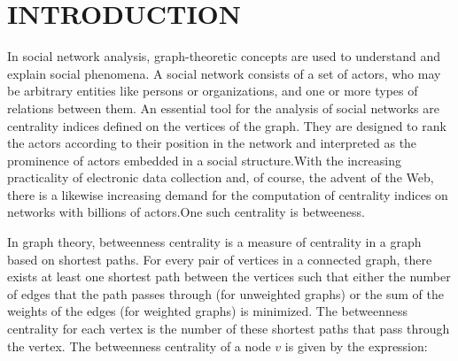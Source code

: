 \documentclass[MTech]{iitmdiss}
\begin{document}
\pagebreak
{}








\chapter{INTRODUCTION}
\label{chap:intro}

In social network analysis, graph-theoretic concepts are used to understand and explain social phenomena. A social network consists of a set of actors, who may be arbitrary entities like persons or organizations, and one or more types of relations between them. An essential tool for the analysis of social networks are centrality indices defined on the vertices of the graph. They are designed to rank the actors according to their position in the network and interpreted as the prominence of actors embedded in a social structure.With the increasing practicality of electronic data collection and, of course, the advent of the Web, there is a likewise increasing demand for the computation of centrality indices on networks with billions of actors.One such centrality is betweeness. 

In graph theory, betweenness centrality is a measure of centrality in a graph based on shortest paths. For every pair of vertices in a connected graph, there exists at least one shortest path between the vertices such that either the number of edges that the path passes through (for unweighted graphs) or the sum of the weights of the edges (for weighted graphs) is minimized. The betweenness centrality for each vertex is the number of these shortest paths that pass through the vertex.
The betweenness centrality of a node $v$ is given by the expression:
\end{document}
